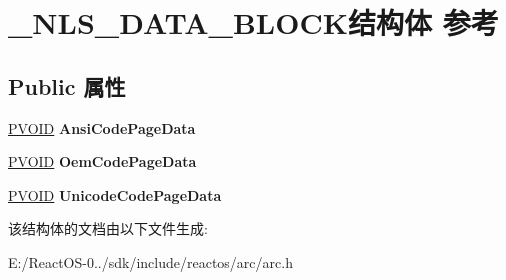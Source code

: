 \hypertarget{struct___n_l_s___d_a_t_a___b_l_o_c_k}{}\section{\+\_\+\+N\+L\+S\+\_\+\+D\+A\+T\+A\+\_\+\+B\+L\+O\+C\+K结构体 参考}
\label{struct___n_l_s___d_a_t_a___b_l_o_c_k}
\subsection*{Public 属性}
\begin{DoxyCompactItemize}
\item 
\mbox{\label{struct___n_l_s___d_a_t_a___b_l_o_c_k_ab3b7ce5012d0b6344e6e9bb610612e93}} 
\hyperlink{interfacevoid}{P\+V\+O\+ID} {\bfseries Ansi\+Code\+Page\+Data}
\item 
\mbox{\label{struct___n_l_s___d_a_t_a___b_l_o_c_k_ae2751d4acc73a66f1a35eabed0344087}} 
\hyperlink{interfacevoid}{P\+V\+O\+ID} {\bfseries Oem\+Code\+Page\+Data}
\item 
\mbox{\label{struct___n_l_s___d_a_t_a___b_l_o_c_k_a3cd95cc914b9a1b10bd7db84d86cdd21}} 
\hyperlink{interfacevoid}{P\+V\+O\+ID} {\bfseries Unicode\+Code\+Page\+Data}
\end{DoxyCompactItemize}


该结构体的文档由以下文件生成\+:\begin{DoxyCompactItemize}
\item 
E\+:/\+React\+O\+S-\/0../sdk/include/reactos/arc/arc.\+h\end{DoxyCompactItemize}
